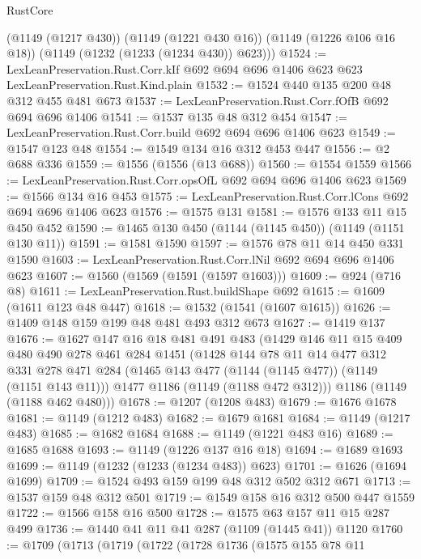\begin{lexlean}{RustCore}
\begin{coremodule}
      (@1149 (@1217 @430))
      (@1149 (@1221 @430 @16))
      (@1149 (@1226 @106 @16 @18))
      (@1149 (@1232 (@1233 (@1234 @430)) @623)))
@1524 := LexLeanPreservation.Rust.Corr.kIf
    @692
    @694
    @696
    @1406
    @623
    @623
    LexLeanPreservation.Rust.Kind.plain
@1532 := @1524 @440 @135 @200 @48 @312 @455 @481 @673
@1537 := LexLeanPreservation.Rust.Corr.fOfB @692 @694 @696 @1406
@1541 := @1537 @135 @48 @312 @454
@1547 := LexLeanPreservation.Rust.Corr.build @692 @694 @696 @1406 @623
@1549 := @1547 @123 @48
@1554 := @1549 @134 @16 @312 @453 @447
@1556 := @2 @688 @336
@1559 := @1556 (@1556 (@13 @688))
@1560 := @1554 @1559
@1566 := LexLeanPreservation.Rust.Corr.opsOfL @692 @694 @696 @1406 @623
@1569 := @1566 @134 @16 @453
@1575 := LexLeanPreservation.Rust.Corr.lCons @692 @694 @696 @1406 @623
@1576 := @1575 @131
@1581 := @1576 @133 @11 @15 @450 @452
@1590 := @1465 @130 @450 (@1144 (@1145 @450)) (@1149 (@1151 @130 @11))
@1591 := @1581 @1590
@1597 := @1576 @78 @11 @14 @450 @331 @1590
@1603 := LexLeanPreservation.Rust.Corr.lNil @692 @694 @696 @1406 @623
@1607 := @1560 (@1569 (@1591 (@1597 @1603)))
@1609 := @924 (@716 @8)
@1611 := LexLeanPreservation.Rust.buildShape @692
@1615 := @1609 (@1611 @123 @48 @447)
@1618 := @1532 (@1541 (@1607 @1615))
@1626 := @1409 @148 @159 @199 @48 @481 @493 @312 @673
@1627 := @1419 @137
@1676 := @1627
    @147
    @16
    @18
    @481
    @491
    @483
    (@1429
      @146
      @11
      @15
      @409
      @480
      @490
      @278
      @461
      @284
      @1451
      (@1428
        @144
        @78
        @11
        @14
        @477
        @312
        @331
        @278
        @471
        @284
        (@1465 @143 @477 (@1144 (@1145 @477)) (@1149 (@1151 @143 @11)))
        @1477
        @1186
        (@1149 (@1188 @472 @312)))
      @1186
      (@1149 (@1188 @462 @480)))
@1678 := @1207 (@1208 @483)
@1679 := @1676 @1678
@1681 := @1149 (@1212 @483)
@1682 := @1679 @1681
@1684 := @1149 (@1217 @483)
@1685 := @1682 @1684
@1688 := @1149 (@1221 @483 @16)
@1689 := @1685 @1688
@1693 := @1149 (@1226 @137 @16 @18)
@1694 := @1689 @1693
@1699 := @1149 (@1232 (@1233 (@1234 @483)) @623)
@1701 := @1626 (@1694 @1699)
@1709 := @1524 @493 @159 @199 @48 @312 @502 @312 @671
@1713 := @1537 @159 @48 @312 @501
@1719 := @1549 @158 @16 @312 @500 @447 @1559
@1722 := @1566 @158 @16 @500
@1728 := @1575 @63 @157 @11 @15 @287 @499
@1736 := @1440 @41 @11 @41 @287 (@1109 (@1445 @41)) @1120
@1760 := @1709
    (@1713
      (@1719
        (@1722
          (@1728
            @1736
            (@1575
              @155
              @78
              @11

\end{coremodule}
\end{lexlean}
